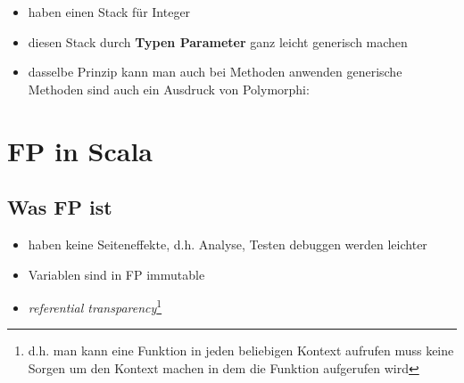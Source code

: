 \begin{itemize}
  \item haben einen Stack für Integer
  
  
  
  \item diesen Stack durch \textbf{Typen Parameter} ganz leicht generisch machen
  
  
  
  \item dasselbe Prinzip kann man auch bei Methoden anwenden \und generische
  Methoden sind auch ein Ausdruck von Polymorphi:
  
  
\end{itemize}
\pagebreak


\section{FP in Scala}


\subsection{Was FP ist}
\begin{itemize}
  \item haben keine Seiteneffekte, d.h. Analyse, Testen \und debuggen
  werden leichter
  \item Variablen sind in FP immutable
  \item \textit{referential transparency}\footnote{d.h. man kann eine
  Funktion in jeden beliebigen Kontext aufrufen \und muss keine Sorgen 
  um den Kontext machen in dem die Funktion aufgerufen wird}
\end{itemize}


